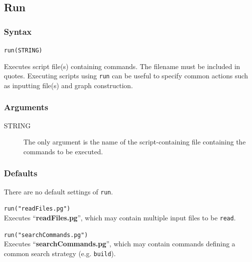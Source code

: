 \subsection{Run}
	\subsubsection{Syntax}
		\texttt{run(STRING)}
		
	\begin{phygdescription}
		{Executes \phyg script file(s) containing commands. The filename must be 
		included in quotes. Executing scripts using \texttt{run} can be useful to specify 
		common actions such as inputting file(s) and graph construction.}
	\end{phygdescription}
	
	\subsubsection{Arguments}
	\begin{description} 
		
		\item[STRING] The only argument is the name of the script-containing file
		 containing the commands to be executed.
		 
	\end{description}
		
	\subsubsection{Defaults}
		There are no default settings of \texttt{run}. 
	
	\begin{example}
	
		\item{\texttt{run("readFiles.pg")}\\ Executes ``\textbf{readFiles.pg}'', which 
		may contain multiple input files to be \texttt{read}.}
		
		\item{\texttt{run("searchCommands.pg")}\\ Executes ``\textbf{searchCommands.pg}'', 
		which may contain commands defining a common search strategy (e.g. 
		\texttt{build}).}
		
	\end{example}

